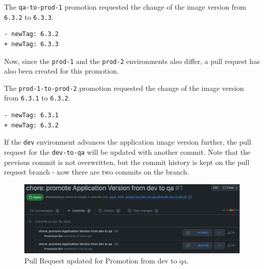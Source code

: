 
The \lstinline|qa-to-prod-1| promotion requested the change of the image version from
\lstinline|6.3.2| to \lstinline|6.3.3|.

\begin{lstlisting}
- newTag: 6.3.2
+ newTag: 6.3.3
\end{lstlisting}

Now, since the \lstinline|prod-1| and the \lstinline|prod-2| environments
also differ,
a pull request has also been created for this promotion.


The \lstinline|prod-1-to-prod-2| promotion requested the change of the image version from
\lstinline|6.3.1| to \lstinline|6.3.2|.

\begin{lstlisting}
- newTag: 6.3.1
+ newTag: 6.3.2
\end{lstlisting}

If the \lstinline|dev| environment advances the application image version further,
the pull request for the \lstinline|dev-to-qa| will be updated with another commit.
Note that the previous commit is not overwritten, 
but the commit history is kept on the pull request branch - now there are two commits on the branch.

\begin{figure}[h]
	\centering
	\includegraphics[width=1.00\linewidth]{assets/prom-pr-dev-to-qa-round2.png}
	\caption{Pull Request updated for Promotion from dev to qa.
	}
	\label{fig:prom-pr-dev-to-qa-round2}	
\end{figure}


